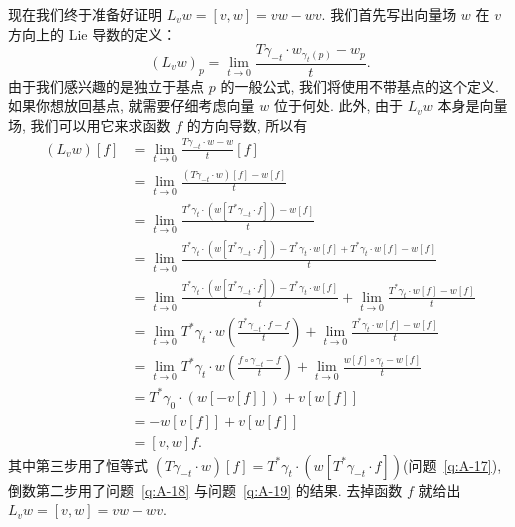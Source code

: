 现在我们终于准备好证明 $L_vw=[v,w]=vw-wv$. 我们首先写出向量场 $w$ 在 $v$ 方向上的 Lie 导数的定义：
\[
(L_vw)_p=\lim_{t\to0}\frac{T\gamma_{-t}\cdot w_{\gamma_t(p)}-w_p}{t}.
\]
由于我们感兴趣的是独立于基点 $p$ 的一般公式, 我们将使用不带基点的这个定义. 如果你想放回基点, 就需要仔细考虑向量 $w$ 位于何处. 此外, 由于 $L_vw$ 本身是向量场, 我们可以用它来求函数 $f$ 的方向导数, 所以有
\begin{align*}
\left(L_vw\right)[f]&=\lim_{t\to0}\frac{T\gamma_{-t}\cdot w-w}{t}[f]\\
&=\lim_{t\to0}\frac{\left(T\gamma_{-t}\cdot w\right)[f]-w[f]}{t}\\
&=\lim_{t\to0}\frac{T^*\gamma_t\cdot\left(w\left[T^*\gamma_{-t}\cdot f\right]\right)-w[f]}{t}\\
&=\lim_{t\to0}\frac{T^*\gamma_t\cdot\left(w\left[T^*\gamma_{-t}\cdot f\right]\right)-T^*\gamma_t\cdot w[f]+T^*\gamma_t\cdot w[f]-w[f]}{t}\\
&=\lim_{t\to0}\frac{T^*\gamma_t\cdot\left(w\left[T^*\gamma_{-t}\cdot f\right]\right)-T^*\gamma_t\cdot w[f]}{t}+\lim_{t\to0}\frac{T^*\gamma_t\cdot w[f]-w[f]}{t}\\
&=\lim_{t\to0}T^*\gamma_t\cdot w\left(\frac{T^*\gamma_{-t}\cdot f-f}{t}\right)+\lim_{t\to0}\frac{T^*\gamma_t\cdot w[f]-w[f]}{t}\\
&=\lim_{t\to0}T^*\gamma_t\cdot w\left(\frac{f\circ\gamma_{-t}-f}{t}\right)+\lim_{t\to0}\frac{w[f]\circ\gamma_t-w[f]}{t}\\
&=T^*\gamma_0\cdot\left(w\left[-v[f]\right]\right)+v\left[w[f]\right]\\
&=-w\left[v[f]\right]+v\left[w[f]\right]\\
&=[v,w]f.
\end{align*}
其中第三步用了恒等式 $\left(T\gamma_{-t}\cdot w\right)[f]=T^*\gamma_t\cdot\left(w\left[T^*\gamma_{-t}\cdot f\right]\right)$(问题~\ref{q:A-17}), 倒数第二步用了问题~\ref{q:A-18} 与问题~\ref{q:A-19} 的结果. 去掉函数 $f$ 就给出 $L_vw=[v,w]=vw-wv$.

